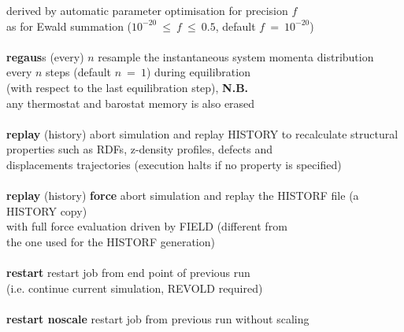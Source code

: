 \begin{tabbing}
\>                                              \> derived by automatic parameter optimisation for precision $f$ \\
\>                                              \> as for Ewald summation ($10^{-20}~\le~f~\le~0.5$, default $f~=~10^{-20}$) \\
\>                                              \> \\
\> {\bf regaus}s (every) $n$                    \> resample the instantaneous system momenta distribution \\
\>                                              \> every $n$ steps (default $n~=~1$) during equilibration \\
\>                                              \> (with respect to the last equilibration step), {\bf N.B.} \\
\>                                              \> any thermostat and barostat memory is also erased \\
\>                                              \> \\
\> {\bf replay} (history)                       \> abort simulation and replay HISTORY to recalculate structural \\
\>                                              \> properties such as RDFs, z-density profiles, defects and \\
\>                                              \> displacements trajectories (execution halts if no property is specified) \\
\>                                              \> \\
\> {\bf replay} (history) {\bf force}           \> abort simulation and replay the HISTORF file (a HISTORY copy) \\
\>                                              \> with full force evaluation driven by FIELD (different from \\
\>                                              \> the one used for the HISTORF generation) \\
\>                                              \> \\
\> {\bf restart}                                \> restart job from end point of previous run \\
\>                                              \> (i.e. continue current simulation, REVOLD required) \\
\>                                              \> \\
\> {\bf restart noscale}                        \> restart job from previous run without scaling \\

\end{tabbing}
